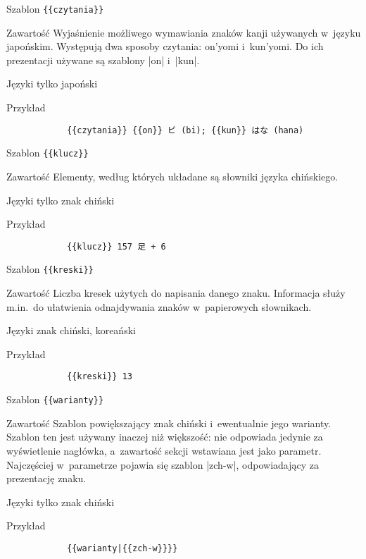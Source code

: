 \documentclass{pracamgr}
\begin{document}
\spacer %
\begin{opis}
	\item[Szablon] \verb|{{czytania}}|
	\item[Zawartość] Wyjaśnienie możliwego wymawiania znaków kanji używanych w~języku japońskim. Występują dwa sposoby czytania: on'yomi i~kun'yomi. Do ich prezentacji używane są szablony \kod|{{on}}| i~\kod|{{kun}}|.
	\item[Języki] tylko japoński
	\item[Przykład]
		\begin{verbatim}
			{{czytania}} {{on}} ビ (bi); {{kun}} はな (hana)
		\end{verbatim}
\end{opis}
\spacer
\begin{opis}
	\item[Szablon] \verb|{{klucz}}|
	\item[Zawartość] Elementy, według których układane są słowniki języka chińskiego.
	\item[Języki] tylko znak chiński
	\item[Przykład]
		\begin{verbatim}
			{{klucz}} 157 足 + 6
		\end{verbatim}
\end{opis}
\spacer
\begin{opis}
	\item[Szablon] \verb|{{kreski}}|
	\item[Zawartość] Liczba kresek użytych do napisania danego znaku. Informacja służy m.in.\ do ułatwienia odnajdywania znaków w~papierowych słownikach.
	\item[Języki] znak chiński, koreański
	\item[Przykład]
		\begin{verbatim}
			{{kreski}} 13
		\end{verbatim}
\end{opis}
\spacer
\begin{opis}
	\item[Szablon] \verb|{{warianty}}|
	\item[Zawartość] Szablon powiększający znak chiński i~ewentualnie jego warianty. Szablon ten jest używany inaczej niż większość: nie odpowiada jedynie za wyświetlenie nagłówka, a~zawartość sekcji wstawiana jest jako parametr. Najczęściej w~parametrze pojawia się szablon \kod|{{zch-w}}|, odpowiadający za prezentację znaku.
	\item[Języki] tylko znak chiński
	\item[Przykład]
		\begin{verbatim}
			{{warianty|{{zch-w}}}}
		\end{verbatim}
\end{opis}
\end{document}
